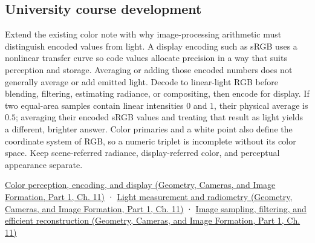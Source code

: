 \subsection{University course development}\label{appendix-a9f83ad40792-university-course-development}

\hypertarget{appendix-a9f83ad40792-university-course-development}{}

Extend the existing color note with why image-processing arithmetic must distinguish encoded values from light. A display encoding such as sRGB uses a nonlinear transfer curve so code values allocate precision in a way that suits perception and storage. Averaging or adding those encoded numbers does not generally average or add emitted light. Decode to linear-light RGB before blending, filtering, estimating radiance, or compositing, then encode for display. If two equal-area samples contain linear intensities \(0\) and \(1\), their physical average is \(0.5\); averaging their encoded sRGB values and treating that result as light yields a different, brighter answer. Color primaries and a white point also define the coordinate system of RGB, so a numeric triplet is incomplete without its color space. Keep scene-referred radiance, display-referred color, and perceptual appearance separate.

\href{../03-Geometry-Cameras-and-Image-Formation-P01/main.pdf\#nameddest=03-visual-computing-i-ch004-color-perception-encoding-and-display}{Color perception, encoding, and display (Geometry, Cameras, and Image Formation, Part 1, Ch. 11)} · \href{../03-Geometry-Cameras-and-Image-Formation-P01/main.pdf\#nameddest=03-visual-computing-i-ch004-light-measurement-and-radiometry}{Light measurement and radiometry (Geometry, Cameras, and Image Formation, Part 1, Ch. 11)} · \href{../03-Geometry-Cameras-and-Image-Formation-P01/main.pdf\#nameddest=03-visual-computing-i-ch004-image-sampling-filtering-and-efficient-reconstruction}{Image sampling, filtering, and efficient reconstruction (Geometry, Cameras, and Image Formation, Part 1, Ch. 11)}
